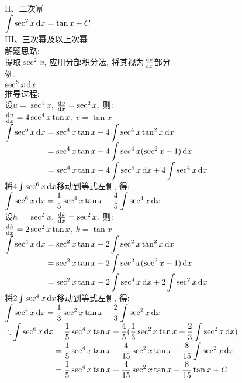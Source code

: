 II、二次幂\\
$\displaystyle\int\sec^2x\mathop{}\!\mathrm{d} x=\tan x+C$\\

III、三次幂及以上次幂\\
解题思路:\\
提取$\sec^2x$, 应用分部积分法, 将其视为$\frac{\mathop{}\!\mathrm{d} v}{\mathop{}\!\mathrm{d} x}$部分\\
例.\\
\phantom{例}$\displaystyle\sec^6x\mathop{}\!\mathrm{d} x$\\
推导过程:\\
设$u=\sec^4x$, $\frac{\mathop{}\!\mathrm{d} v}{\mathop{}\!\mathrm{d} x}=\sec^2x$, 则:\\
\phantom{设}$\frac{\mathop{}\!\mathrm{d} u}{\mathop{}\!\mathrm{d} x}=4\sec^4x\tan x$, $v=\tan x$\\
$\displaystyle\int\sec^6x\mathop{}\!\mathrm{d} x=\sec^4x\tan x-4\int\sec^4x\tan^2x\mathop{}\!\mathrm{d} x$\\
$\displaystyle\phantom{\int\sec^6x\dif x}=\sec^4x\tan x-4\int\sec^4x(\sec^2x-1)\dif x$\\
$\displaystyle\phantom{\int\sec^6x\dif x}=\sec^4x\tan x-4\int\sec^6x\dif x+4\int\sec^4x\dif x$\\
将$4\int\sec^6x\mathop{}\!\mathrm{d} x$移动到等式左侧, 得:\\
$\displaystyle\int\sec^6x\mathop{}\!\mathrm{d} x=\frac{1}{5}\sec^4x\tan x+\frac{4}{5}\int\sec^4x\mathop{}\!\mathrm{d} x$\\
设$h=\sec^2x$, $\frac{\mathop{}\!\mathrm{d} k}{\mathop{}\!\mathrm{d} x}=\sec^2x$, 则:\\
\phantom{设}$\frac{\mathop{}\!\mathrm{d} h}{\mathop{}\!\mathrm{d} x}=2\sec^2x\tan x$, $k=\tan x$\\
$\displaystyle\int\sec^4x\mathop{}\!\mathrm{d} x=\sec^2x\tan x-2\int\sec^2x\tan^2x\mathop{}\!\mathrm{d} x$\\
$\displaystyle\phantom{\int\sec^4x\dif x}=\sec^2x\tan x-2\int\sec^2x(\sec^2x-1)\dif x$\\
$\displaystyle\phantom{\int\sec^4x\dif x}=\sec^2x\tan x-2\int\sec^4x\dif x+2\int\sec^2x\dif x$\\
将$2\int\sec^4x\mathop{}\!\mathrm{d} x$移动到等式左侧, 得:\\
$\displaystyle\int\sec^4x\mathop{}\!\mathrm{d} x=\frac{1}{3}\sec^2x\tan x+\frac{2}{3}\int\sec^2x\mathop{}\!\mathrm{d} x$\\
$\displaystyle\therefore\int\sec^6x\mathop{}\!\mathrm{d} x=\frac{1}{5}\sec^4x\tan x+\frac{4}{5}(\frac{1}{3}\sec^2x\tan x+\frac{2}{3}\int\sec^2x\mathop{}\!\mathrm{d} x)$\\
$\displaystyle\phantom{\therefore\int\sec^6x\dif x}=\frac{1}{5}\sec^4x\tan x+\frac{4}{15}\sec^2x\tan x+\frac{8}{15}\int\sec^2x\dif x$\\
$\displaystyle\phantom{\therefore\int\sec^6x\dif x}=\frac{1}{5}\sec^4x\tan x+\frac{4}{15}\sec^2x\tan x+\frac{8}{15}\tan x+C$\\[2ex]

